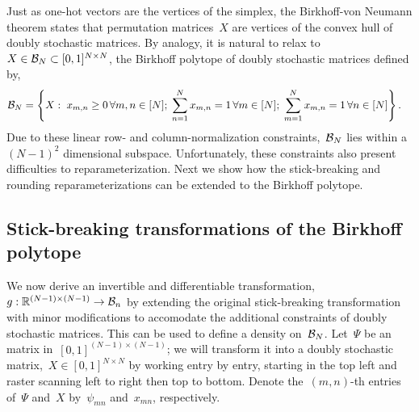 \documentclass[twoside]{article}
\begin{document}
Just as one-hot vectors are the vertices of the simplex, the
Birkhoff-von Neumann theorem states that permutation matrices~$X$ are
vertices of the convex hull of doubly stochastic matrices. By analogy,
it is natural to relax to~${X \in \mathcal{B}_N \subset [0,1]^{N \times N}}$,
the Birkhoff polytope of doubly stochastic matrices defined by,
\begin{align}
  \mathcal{B}_N &= \left \{X: \;
           x_{m,n} \geq 0 \, \forall m,n \in [N]; \;
           \sum_{n=1}^N x_{m,n} = 1 \, \forall m \in [N]; \;
           \sum_{m=1}^N x_{m,n} =1 \, \forall n \in [N]\right\}.
\end{align}
Due to these linear row- and column-normalization
constraints,~$\mathcal{B}_N$ lies within a~${(N-1)^2}$ dimensional subspace.
Unfortunately, these constraints also present difficulties to
reparameterization.  Next we show how the stick-breaking and rounding
reparameterizations can be extended to the Birkhoff polytope.

\subsection{Stick-breaking transformations of the Birkhoff polytope}
We now derive an invertible and differentiable
transformation,~$g: \mathbb{R}^{(N-1) \times (N-1)} \to \mathcal{B}_n$ by
extending the original stick-breaking transformation with minor
modifications to accomodate the additional constraints of doubly
stochastic matrices. This can be used to define a density
on~$\mathcal{B}_N$. Let~$\Psi$ be an matrix
in~${[0,1]^{(N-1) \times (N-1)}}$; we will transform it into a doubly
stochastic matrix,~$X \in [0,1]^{N \times N}$ by working entry by
entry, starting in the top left and raster scanning left to right then
top to bottom. Denote the~$(m,n)$-th entries of~$\Psi$ and~$X$
by~$\psi_{mn}$ and~${x}_{mn}$, respectively.
\end{document}
